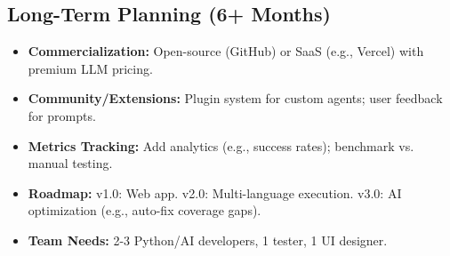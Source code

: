 \documentclass{article}
\begin{document}
\subsection{Long-Term Planning (6+ Months)}
\begin{itemize}
    \item \textbf{Commercialization:} Open-source (GitHub) or SaaS (e.g., Vercel) with premium LLM pricing.
    \item \textbf{Community/Extensions:} Plugin system for custom agents; user feedback for prompts.
    \item \textbf{Metrics Tracking:} Add analytics (e.g., success rates); benchmark vs. manual testing.
    \item \textbf{Roadmap:} v1.0: Web app. v2.0: Multi-language execution. v3.0: AI optimization (e.g., auto-fix coverage gaps).
    \item \textbf{Team Needs:} 2-3 Python/AI developers, 1 tester, 1 UI designer.
\end{itemize}
\end{document}
